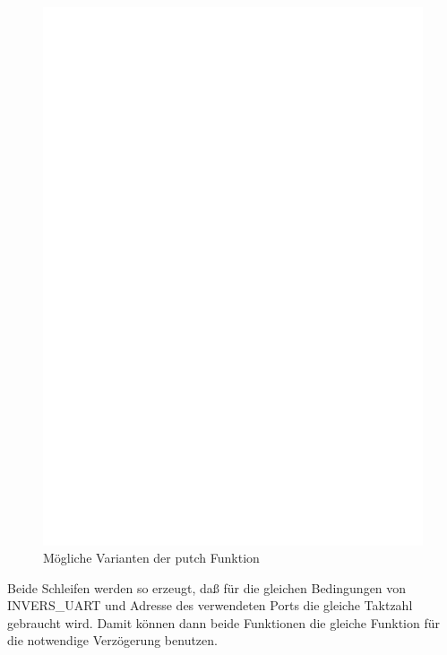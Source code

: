\begin{figure}[H]
\centering
\includegraphics[]{../FIG/uart_putch_timing.eps}
\caption{Mögliche Varianten der putch Funktion}
\label{fig:putch_timing}
\end{figure}

Beide Schleifen werden so erzeugt, daß für die gleichen Bedingungen von INVERS\_UART und Adresse des verwendeten
Ports die gleiche Taktzahl gebraucht wird. Damit können dann beide Funktionen die gleiche
Funktion für die notwendige Verzögerung benutzen.

